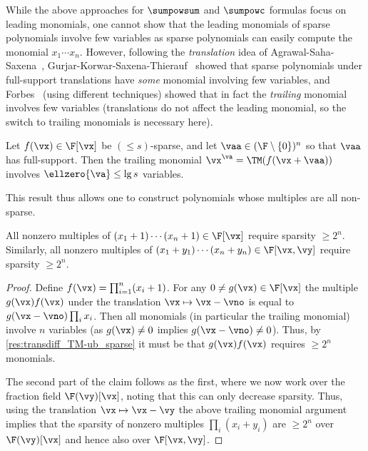 \documentclass{toc}
\begin{document}
While the above approaches for $\sumpowsum$ and $\sumpowc$ formulas focus on leading monomials, one cannot show that the leading monomials of sparse polynomials involve few variables as sparse polynomials can easily compute the monomial $x_1\cdots x_n$.  However, following the \emph{translation} idea of Agrawal-Saha-Saxena~\cite{AgrawalSS13}, Gurjar-Korwar-Saxena-Thierauf~\cite{GurjarKST15} showed that sparse polynomials under full-support translations have \emph{some} monomial involving few variables, and Forbes~\cite{Forbes15} (using different techniques) showed that in fact the \emph{trailing} monomial involves few variables (translations do not affect the leading monomial, so the switch to trailing monomials is necessary here).

\begin{theoremwp}\label{res:transdiff_TM-ub_sparse}
        Let $f(\vx)\in\F[\vx]$ be $(\le s)$-sparse, and let $\vaa\in(\F\setminus\{0\})^n$ so that $\vaa$ has full-support.  Then the trailing monomial $\vx^\va=\TM(f(\vx+\vaa))$ involves $\ellzero{\va}\le \lg s$ variables.
\end{theoremwp}

This result thus allows one to construct polynomials whose multiples are all non-sparse.

\begin{corollary}\label{res:lbs-mult:sparse-LM}
        All nonzero multiples of $(x_1+1)\cdots (x_n+1)\in\F[\vx]$ require sparsity $\ge 2^n$.  Similarly, all nonzero multiples of $(x_1+y_1)\cdots (x_n+y_n)\in\F[\vx,\vy]$ require sparsity $\ge 2^n$.
\end{corollary}
\begin{proof}
        Define $f(\vx)=\prod_{i=1}^n (x_i+1)$. For any $0\ne g(\vx)\in\F[\vx]$ the multiple $g(\vx)f(\vx)$ under the translation $\vx\mapsto \vx-\vno$ is equal to $g(\vx-\vno)\prod_i x_i$.  Then all monomials (in particular the trailing monomial) involve $n$ variables (as $g(\vx)\ne 0$ implies $g(\vx-\vno)\ne 0$).  Thus, by \autoref{res:transdiff_TM-ub_sparse} it must be that $g(\vx)f(\vx)$ requires $\ge 2^n$ monomials.

        The second part of the claim follows as the first, where we now work over the fraction field $\F(\vy)[\vx]$, noting that this can only decrease sparsity.  Thus, using the translation $\vx\mapsto\vx-\vy$ the above trailing monomial argument implies that the sparsity of nonzero multiples $\prod_i (x_i+y_i)$ are $\ge 2^n$ over $\F(\vy)[\vx]$ and hence also over $\F[\vx,\vy]$.
\end{proof}
\end{document}
